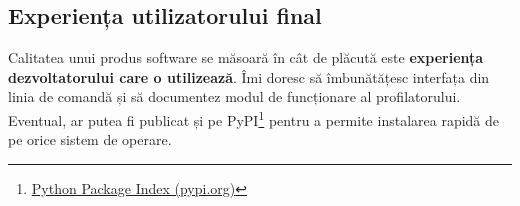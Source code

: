 \subsection*{Experiența utilizatorului final}

Calitatea unui produs software se măsoară în cât de plăcută este \textbf{experiența dezvoltatorului care o utilizează}. Îmi doresc să îmbunătățesc interfața din linia de comandă și să documentez modul de funcționare al profilatorului. Eventual, ar putea fi publicat și pe PyPI\footnote{\href{https://pypi.org/}{Python Package Index (pypi.org)}} pentru a permite instalarea rapidă de pe orice sistem de operare.